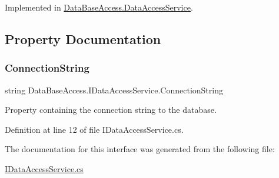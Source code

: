Implemented in \mbox{\hyperlink{classDataBaseAccess_1_1DataAccessService_a422e6ead446da4cfcdc33255193ac92e}{Data\+Base\+Access.\+Data\+Access\+Service}}.



\subsection{Property Documentation}
\mbox{\label{interfaceDataBaseAccess_1_1IDataAccessService_aced282143a1c60f5cc534af50cf10b32}} 
\subsubsection{\texorpdfstring{ConnectionString}{ConnectionString}}
{\footnotesize\ttfamily string Data\+Base\+Access.\+I\+Data\+Access\+Service.\+Connection\+String\hspace{0.3cm}{\ttfamily [get]}}



Property containing the connection string to the database. 



Definition at line 12 of file I\+Data\+Access\+Service.\+cs.



The documentation for this interface was generated from the following file\+:\begin{DoxyCompactItemize}
\item 
\mbox{\hyperlink{IDataAccessService_8cs}{I\+Data\+Access\+Service.\+cs}}\end{DoxyCompactItemize}
